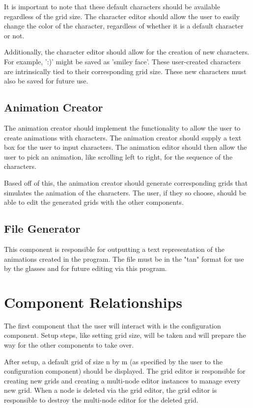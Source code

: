 \documentclass[12pt]{article}
\begin{document}
It is important to note that these default characters should be available regardless of the grid size. The character editor should allow the user to easily change the color of the character, regardless of whether it is a default character or not.

Additionally, the character editor should allow for the creation of new characters. For example, ':)' might be saved as 'smiley face'. These user-created characters are intrinsically tied to their corresponding grid size. These new characters must also be saved for future use.

\subsection{Animation Creator}
The animation creator should implement the functionality to allow the user to create animations with characters. The animation creator should supply a text box for the user to input characters. The animation editor should then allow the user to pick an animation, like scrolling left to right, for the sequence of the characters.

Based off of this, the animation creator should generate corresponding grids that simulates the animation of the characters. The user, if they so choose, should be able to edit the generated grids with the other components. 

\subsection{File Generator}
This component is responsible for outputting a text representation of the animations created in the program. The file must be in the "tan" format for use by the glasses and for future editing via this program.

\section{Component Relationships}
The first component that the user will interact with is the configuration component. Setup steps, like setting grid size, will be taken and will prepare the way for the other components to take over.

After setup, a default grid of size n by m (as specified by the user to the configuration component) should be displayed. The grid editor is responsible for creating new grids and creating a multi-node editor instances to manage every new grid. When a node is deleted via the grid editor, the grid editor is responsible to destroy the multi-node editor for the deleted grid.
\end{document}
